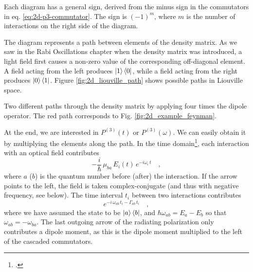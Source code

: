 Each diagram has a general sign, derived from the minus sign in the commutators in eq. \ref{eq:2d-p3-commutator}. The sign is $(-1)^m$, where $m$ is the number of interactions on the right side of the diagram.

The diagram represents a path between elements of the density matrix. As we saw in the Rabi Oscillations chapter when the density matrix was introduced, a light field first causes a non-zero value of the corresponding off-diagonal element. A field acting from the left produces $\ket{1} \bra{0}$, while a field acting from the right produces $\ket{0} \bra{1}$. Figure \ref{fig:2d_liouville_path} shows possible paths in Liouville space.

\begin{marginfigure}

\caption{
Two different paths  through the density matrix by applying four times the dipole operator. The red path corresponds to Fig. \ref{fig:2d_example_feynman}.}
\label{fig:2d_liouville_path}
\end{marginfigure}

At the end, we are interested in $P^{(3)}(t)$ or $P^{(3)}(\omega)$. We can easily obtain it by multiplying the elements along the path. In the time domain\footcite{Mukamel1995,HammZanni2011,Hamm-dummies}, each interaction with an optical field contributes
\begin{equation}
 - \frac{i}{\hbar} \, \mu_{ba} \, E_i(t)  \, e^{-i \omega_i \, t} \quad ,
\end{equation}
where $a$ ($b$) is the quantum number before (after) the interaction. If the arrow points to the left, the field is taken complex-conjugate (and thus with negative frequency, see below). The time interval $t_i$ between two interactions contributes 
%
\begin{equation}
 e^{-i \, \omega_{ab} \, t_i - \Gamma_{ab} \, t_i} \quad ,
\end{equation}
%
where we have assumed the state to be $\ket{a} \bra{b}$, and  $\hbar \omega_{ab} = E_a - E_b$ so that $\omega_{ab}  = - \omega_{ba} $. The last outgoing arrow of the radiating polarization only contributes a dipole moment, as this is the dipole moment multiplied to the left of the cascaded commutators.

